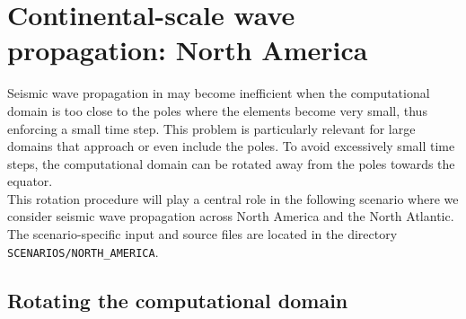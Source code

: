 \section{Continental-scale wave propagation: North America}\label{S:North_America}

Seismic wave propagation in \SES may become inefficient when the computational domain is too close to the poles where the elements become very small, thus enforcing a small time step. This problem is particularly relevant for large domains that approach or even include the poles. To avoid excessively small time steps, the computational domain can be rotated away from the poles towards the equator.\\[5pt]
This rotation procedure will play a central role in the following scenario where we consider seismic wave propagation across North America and the North Atlantic. The scenario-specific input and source files are located in the directory \texttt{SCENARIOS/NORTH\_AMERICA}.


\subsection{Rotating the computational domain}

